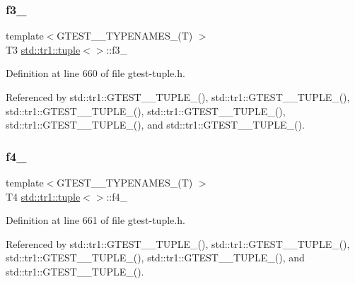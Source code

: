 \mbox{\label{classstd_1_1tr1_1_1tuple_ad4d3673e0d5c07c392c02e335fe978ff}} 
\subsubsection{\texorpdfstring{f3\+\_\+}{f3\_}}
{\footnotesize\ttfamily template$<$G\+T\+E\+S\+T\+\_\+\_\+\+T\+Y\+P\+E\+N\+A\+M\+E\+S\+\_\+(\+T) $>$ \\
T3 \hyperlink{classstd_1_1tr1_1_1tuple}{std\+::tr1\+::tuple}$<$$>$\+::f3\+\_\+}



Definition at line 660 of file gtest-\/tuple.\+h.



Referenced by std\+::tr1\+::\+G\+T\+E\+S\+T\+\_\+\_\+\+T\+U\+P\+L\+E\+\_\+(), std\+::tr1\+::\+G\+T\+E\+S\+T\+\_\+\_\+\+T\+U\+P\+L\+E\+\_\+(), std\+::tr1\+::\+G\+T\+E\+S\+T\+\_\+\_\+\+T\+U\+P\+L\+E\+\_\+(), std\+::tr1\+::\+G\+T\+E\+S\+T\+\_\+\_\+\+T\+U\+P\+L\+E\+\_\+(), std\+::tr1\+::\+G\+T\+E\+S\+T\+\_\+\_\+\+T\+U\+P\+L\+E\+\_\+(), and std\+::tr1\+::\+G\+T\+E\+S\+T\+\_\+\_\+\+T\+U\+P\+L\+E\+\_\+().

\mbox{\label{classstd_1_1tr1_1_1tuple_ab662f1051c2302d065796383848db6c4}} 
\subsubsection{\texorpdfstring{f4\+\_\+}{f4\_}}
{\footnotesize\ttfamily template$<$G\+T\+E\+S\+T\+\_\+\_\+\+T\+Y\+P\+E\+N\+A\+M\+E\+S\+\_\+(\+T) $>$ \\
T4 \hyperlink{classstd_1_1tr1_1_1tuple}{std\+::tr1\+::tuple}$<$$>$\+::f4\+\_\+}



Definition at line 661 of file gtest-\/tuple.\+h.



Referenced by std\+::tr1\+::\+G\+T\+E\+S\+T\+\_\+\_\+\+T\+U\+P\+L\+E\+\_\+(), std\+::tr1\+::\+G\+T\+E\+S\+T\+\_\+\_\+\+T\+U\+P\+L\+E\+\_\+(), std\+::tr1\+::\+G\+T\+E\+S\+T\+\_\+\_\+\+T\+U\+P\+L\+E\+\_\+(), std\+::tr1\+::\+G\+T\+E\+S\+T\+\_\+\_\+\+T\+U\+P\+L\+E\+\_\+(), and std\+::tr1\+::\+G\+T\+E\+S\+T\+\_\+\_\+\+T\+U\+P\+L\+E\+\_\+().

